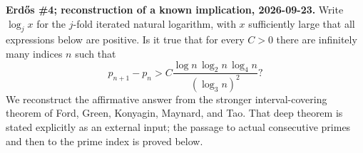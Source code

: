 \textbf{Erd\H{o}s \#4; reconstruction of a known implication, 2026-09-23.}
Write $\log_j x$ for the $j$-fold iterated natural logarithm, with $x$ sufficiently large that all expressions below are positive. Is it true that for every $C>0$ there are infinitely many indices $n$ such that
\[
 p_{n+1}-p_n>C\frac{\log n\,\log_2n\,\log_4n}{(\log_3n)^2}?
\]
We reconstruct the affirmative answer from the stronger interval-covering theorem of Ford, Green, Konyagin, Maynard, and Tao. That deep theorem is stated explicitly as an external input; the passage to actual consecutive primes and then to the prime index is proved below.

